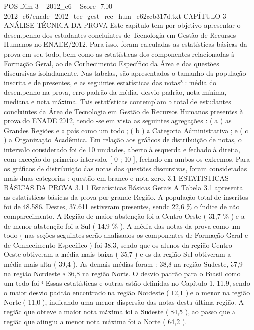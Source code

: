 \begin{textsample}{POS Dim 3 – 2012\_c6 – Score -7.00 – 2012\_c6/enade\_2012\_tec\_gest\_rec\_hum\_c62ecb317d.txt}  \label{ex:f3_pos_264}
CAPÍTULO 3 ANÁLISE TÉCNICA DA PROVA Este capítulo tem por objetivo apresentar o desempenho dos estudantes concluintes de Tecnologia em Gestão de Recursos Humanos no ENADE/2012.
Para isso, foram calculadas as estatísticas básicas da prova em seu todo, bem como as estatísticas dos componentes relacionadas à Formação Geral, ao de Conhecimento Específico da Área e das questões discursivas isoladamente.
Nas tabelas, são apresentados o tamanho da população inscrita e de presentes, e as seguintes estatísticas das notas⁸ : média do desempenho na prova, erro padrão da média, desvio padrão, nota mínima, mediana e nota máxima.
Tais estatísticas contemplam o total de estudantes concluintes da Área de Tecnologia em Gestão de Recursos Humanos presentes à prova do ENADE 2012, tendo -se em vista as seguintes agregações : ( a ) as Grandes Regiões e o país como um todo ; ( b ) a Categoria Administrativa ; e ( c ) a Organização Acadêmica.
Em relação aos gráficos de distribuição de notas, o intervalo considerado foi de 10 unidades, aberto à esquerda e fechado à direita, com exceção do primeiro intervalo, [ 0 ; 10 ], fechado em ambos os extremos.
Para os gráficos de distribuição das notas das questões discursivas, foram consideradas mais duas categorias : questão em branco e nota zero. 3.1 ESTATÍSTICAS BÁSICAS DA PROVA 3.1.1 Estatísticas Básicas Gerais A Tabela 3.1 apresenta as estatísticas básicas da prova por grande Região.
A população total de inscritos foi de 48.586.
Destes, 37.611 estiveram presentes, sendo 22,6 \% o índice de não comparecimento.
A Região de maior abstenção foi a Centro-Oeste ( 31,7 \% ) e a de menor abstenção foi a Sul ( 14,9 \% ).
A média das notas da prova como um todo ( nas seções seguintes serão analisados os componentes de Formação Geral e de Conhecimento Específico ) foi 38,3, sendo que os alunos da região Centro-Oeste obtiveram a média mais baixa ( 35,7 ) e os da região Sul obtiveram a média mais alta ( 39,4 ).
As demais médias foram : 38,8 na região Sudeste, 37,9 na região Nordeste e 36,8 na região Norte.
O desvio padrão para o Brasil como um todo foi ⁸ Essas estatísticas e outras estão definidas no Capítulo 1. 11,9, sendo o maior desvio padrão encontrado na região Nordeste ( 12,1 ) e o menor na região Norte ( 11,0 ), indicando uma menor dispersão das notas desta última região.
A região que obteve a maior nota máxima foi a Sudeste ( 84,5 ), ao passo que a região que atingiu a menor nota máxima foi a Norte ( 64,2 ).

\end{textsample}
